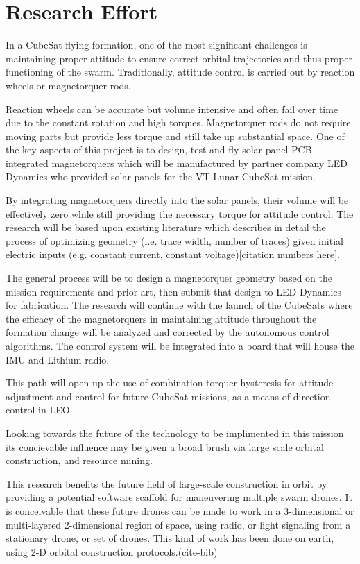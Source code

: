 \section{Research Effort}

In a CubeSat flying formation, one of the most significant challenges
is maintaining proper attitude to ensure correct orbital trajectories
and thus proper functioning of the swarm. Traditionally, attitude
control is carried out by reaction wheels or magnetorquer
rods.

Reaction wheels can be accurate but volume intensive and often
fail over time due to the constant rotation and high
torques. Magnetorquer rods do not require moving parts but provide
less torque and still take up substantial space. One of the key
aspects of this project is to design, test and fly solar panel
PCB-integrated magnetorquers which will be manufactured by partner
company LED Dynamics who provided solar panels for the VT Lunar
CubeSat mission.

By integrating magnetorquers directly into the solar panels, their
volume will be effectively zero while still providing the necessary
torque for attitude control. The research will be based upon existing
literature which describes in detail the process of optimizing
geometry (i.e. trace width, number of traces) given initial electric
inputs (e.g. constant current, constant voltage)[citation numbers here].

 The general process will be to design a magnetorquer
geometry based on the mission requirements and prior art, then submit
that design to LED Dynamics for fabrication. The research will
continue with the launch of the CubeSats where the efficacy of the
magnetorquers in maintaining attitude throughout the formation change
will be analyzed and corrected by the autonomous control
algorithms. The control system will be integrated into a board that
will house the IMU and Lithium radio.

This path will open up the use of combination torquer-hysteresis for
attitude adjustment and control for future CubeSat missions, as a
means of direction control in LEO.

Looking towards the future of the technology to be implimented in this mission
its concievable influence may be given a broad brush via large scale orbital construction,
and resource mining.

This research benefits the future field of large-scale construction in
orbit by providing a potential software scaffold for maneuvering multiple swarm
drones. It is conceivable that these future drones can be made to work
in a 3-dimensional or multi-layered 2-dimensional region of space,
using radio, or light signaling from a stationary drone, or set of
drones. This kind of work has been done on earth, using 2-D orbital
construction protocols.(cite-bib)

